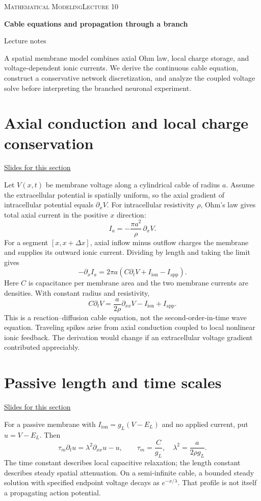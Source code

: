 \documentclass[11pt,letterpaper]{article}
\theoremstyle{definition}\newtheorem{definition}{Definition}\newtheorem{example}{Example}
\numberwithin{equation}{section}
\begin{document}
{\small\scshape Mathematical Modeling\hfill Lecture 10}\par\medskip
{\raggedright{}\LARGE\bfseries\color{ink} Cable equations and propagation through a branch\par}\medskip
{\small Lecture notes}\par\bigskip
A spatial membrane model combines axial Ohm law, local charge storage, and voltage-dependent ionic currents. We derive the continuous cable equation, construct a conservative network discretization, and analyze the coupled voltage solve before interpreting the branched neuronal experiment.

\section{Axial conduction and local charge conservation}
\hypertarget{note-axial-conduction-and-local-charge-conservation}{}\label{note:axial-conduction-and-local-charge-conservation}
{\small \href{slides.html\#frame=axial-ohm-law\&step=1}{Slides for this section}}\par
Let $V(x,t)$ be membrane voltage along a cylindrical cable of radius $a$. Assume the extracellular potential is spatially uniform, so the axial gradient of intracellular potential equals $\partial_xV$. For intracellular resistivity $\rho$, Ohm's law gives total axial current in the positive $x$ direction:
\[
I_a=-\frac{\pi a^2}{\rho}\,\partial_xV.
\]
For a segment $[x,x+\Delta x]$, axial inflow minus outflow charges the membrane and supplies its outward ionic current. Dividing by length and taking the limit gives
\[
-\partial_x I_a=2\pi a(C\partial_tV+I_{\mathrm{ion}}-I_{\mathrm{app}}).
\]
Here $C$ is capacitance per membrane area and the two membrane currents are densities. With constant radius and resistivity,
\[
\boxed{C\partial_tV=\frac a{2\rho}\partial_{xx}V-I_{\mathrm{ion}}+I_{\mathrm{app}}.}
\]
This is a reaction--diffusion cable equation, not the second-order-in-time wave equation. Traveling spikes arise from axial conduction coupled to local nonlinear ionic feedback. The derivation would change if an extracellular voltage gradient contributed appreciably.
\section{Passive length and time scales}
\hypertarget{note-passive-length-and-time-scales}{}\label{note:passive-length-and-time-scales}
{\small \href{slides.html\#frame=passive-membrane-scales\&step=1}{Slides for this section}}\par
For a passive membrane with $I_{\mathrm{ion}}=g_L(V-E_L)$ and no applied current, put $u=V-E_L$. Then
\[
\tau_m\partial_tu=\lambda^2\partial_{xx}u-u,\qquad
\tau_m=\frac C{g_L},\quad \lambda^2=\frac a{2\rho g_L}.
\]
The time constant describes local capacitive relaxation; the length constant describes steady spatial attenuation. On a semi-infinite cable, a bounded steady solution with specified endpoint voltage decays as $e^{-x/\lambda}$. That profile is not itself a propagating action potential.
\end{document}
